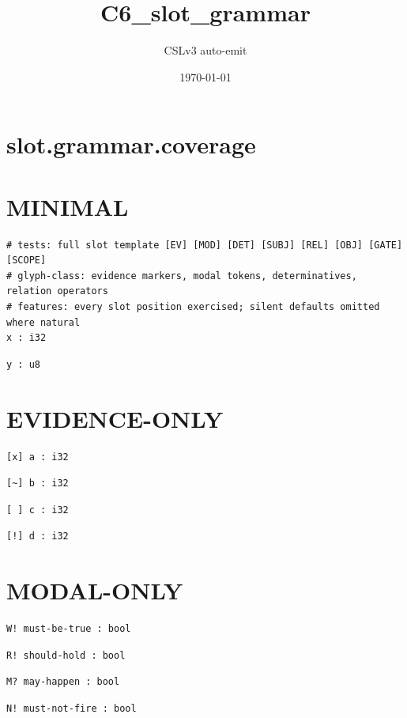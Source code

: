 \documentclass[11pt]{article}
\title{C6\_slot\_grammar}
\author{CSLv3 auto-emit}
\date{\today}
\begin{document}
\maketitle
\tableofcontents

\section{slot.grammar.coverage}\label{sec:slotgrammarcoverage}
\section{MINIMAL}\label{sec:minimal}
\begin{lstlisting}[language=csl]
# tests: full slot template [EV] [MOD] [DET] [SUBJ] [REL] [OBJ] [GATE] [SCOPE]
# glyph-class: evidence markers, modal tokens, determinatives, relation operators
# features: every slot position exercised; silent defaults omitted where natural
x : i32
\end{lstlisting}
\begin{lstlisting}[language=csl]
y : u8
\end{lstlisting}
\section{EVIDENCE-ONLY}\label{sec:evidence-only}
\begin{lstlisting}[language=csl]
[x] a : i32
\end{lstlisting}
\begin{lstlisting}[language=csl]
[~] b : i32
\end{lstlisting}
\begin{lstlisting}[language=csl]
[ ] c : i32
\end{lstlisting}
\begin{lstlisting}[language=csl]
[!] d : i32
\end{lstlisting}
\section{MODAL-ONLY}\label{sec:modal-only}
\begin{lstlisting}[language=csl]
W! must-be-true : bool
\end{lstlisting}
\begin{lstlisting}[language=csl]
R! should-hold : bool
\end{lstlisting}
\begin{lstlisting}[language=csl]
M? may-happen : bool
\end{lstlisting}
\begin{lstlisting}[language=csl]
N! must-not-fire : bool
\end{lstlisting}
\end{document}
